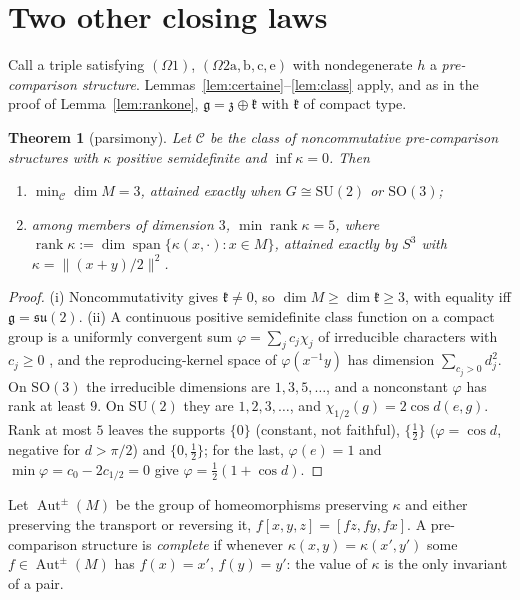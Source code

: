 \documentclass[11pt,reqno]{amsart}
\newtheorem{theorem}{Theorem}[section]
\theoremstyle{definition}
\theoremstyle{remark}
\numberwithin{equation}{section}
\newcommand{\g}{\mathfrak{g}}
\newcommand{\z}{\mathfrak{z}}
\newcommand{\kk}{\mathfrak{k}}
\newcommand{\su}{\mathfrak{su}}
\newcommand{\Aut}{\operatorname{Aut}}
\newcommand{\rk}{\operatorname{rank}}
\newcommand{\hp}[3]{[#1,#2,#3]}
\newcommand{\SU}{\mathrm{SU}}
\newcommand{\SO}{\mathrm{SO}}
\begin{document}
\section{Two other closing laws}\label{sec:closing}

Call a triple satisfying $(\Omega1)$, $(\Omega2\mathrm{a,b,c,e})$ with nondegenerate $h$ a
\emph{pre-comparison structure}.  Lemmas~\ref{lem:certaine}--\ref{lem:class} apply, and as in the proof of
Lemma~\ref{lem:rankone}, $\g=\z\oplus\kk$ with $\kk$ of compact type.

\begin{theorem}[parsimony]\label{thm:parsimony}
Let $\mathcal C$ be the class of noncommutative pre-comparison structures with $\kappa$ positive
semidefinite and $\inf\kappa=0$.  Then
\begin{enumerate}[label=(\roman*)]
\item $\min_{\mathcal C}\dim M=3$, attained exactly when $G\cong\SU(2)$ or $\SO(3)$;
\item among members of dimension $3$, $\min\rk\kappa=5$, where $\rk\kappa:=\dim\operatorname{span}\{\kappa(x,\cdot):x\in M\}$, attained exactly by $S^3$ with
$\kappa=\lVert(x+y)/2\rVert^2$.
\end{enumerate}
\end{theorem}
\begin{proof}
(i) Noncommutativity gives $\kk\ne0$, so $\dim M\ge\dim\kk\ge3$, with equality iff $\g=\su(2)$.
(ii) A continuous positive semidefinite class function on a compact group is a uniformly convergent sum
$\varphi=\sum_jc_j\chi_j$ of irreducible characters with $c_j\ge0$ \cite{PW,Folland}, and the
reproducing-kernel space of $\varphi(x^{-1}y)$ has dimension $\sum_{c_j>0}d_j^2$.  On $\SO(3)$ the
irreducible dimensions are $1,3,5,\dots$, and a nonconstant $\varphi$ has rank at least $9$.  On $\SU(2)$
they are $1,2,3,\dots$, and $\chi_{1/2}(g)=2\cos d(e,g)$.  Rank at most $5$ leaves the supports $\{0\}$
(constant, not faithful), $\{\tfrac12\}$ ($\varphi=\cos d$, negative for $d>\pi/2$) and $\{0,\tfrac12\}$;
for the last, $\varphi(e)=1$ and $\min\varphi=c_0-2c_{1/2}=0$ give $\varphi=\tfrac12(1+\cos d)$.
\end{proof}

Let $\Aut^{\pm}(M)$ be the group of homeomorphisms preserving $\kappa$ and either preserving the transport
or reversing it, $f\hp xyz=\hp{fz}{fy}{fx}$.  A pre-comparison structure is \emph{complete} if whenever
$\kappa(x,y)=\kappa(x',y')$ some $f\in\Aut^\pm(M)$ has $f(x)=x'$, $f(y)=y'$: the value of $\kappa$ is the only
invariant of a pair.
\end{document}

